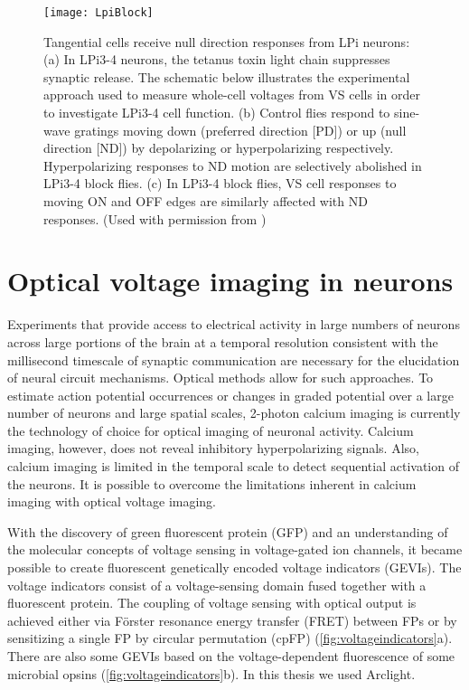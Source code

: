 \begin{figure}
\centering
\hspace*{-1cm} 
\texttt{[image: LpiBlock]}
\caption[Tangential cells receive null direction responses from LPi neurons] {Tangential cells receive null direction responses from LPi neurons: (a) In LPi3-4 neurons, the tetanus toxin light chain suppresses synaptic release. The schematic below illustrates the experimental approach used to measure whole-cell voltages from VS cells in order to investigate LPi3-4 cell function. (b) Control flies respond to sine-wave gratings moving down (preferred direction [PD]) or up (null direction [ND]) by depolarizing or hyperpolarizing respectively. Hyperpolarizing responses to ND motion are selectively abolished in LPi3-4 block flies. (c) In LPi3-4 block flies, VS cell responses to moving ON and OFF edges are similarly affected with ND responses. (Used with permission from \parencite{Mauss2015})} 
\label{fig:lpiblock}
\end{figure}

\section{Optical voltage imaging in neurons}
Experiments that provide access to electrical activity in large numbers of neurons across large portions of the brain at a temporal resolution consistent with the millisecond timescale of synaptic communication are necessary for the elucidation of neural circuit mechanisms. Optical methods allow for such approaches. To estimate action potential occurrences or changes in graded potential over a large number of neurons and large spatial scales, 2-photon calcium imaging is currently the technology of choice for optical imaging of neuronal activity. Calcium imaging, however, does not reveal inhibitory hyperpolarizing signals. Also, calcium imaging is limited in the temporal scale to detect sequential activation of the neurons. It is possible to overcome the limitations inherent in calcium imaging with optical voltage imaging.

With the discovery of green fluorescent protein (GFP) and an understanding of the molecular concepts of voltage sensing in voltage-gated ion channels, it became possible to create fluorescent genetically encoded voltage indicators (GEVIs). The voltage indicators consist of a voltage-sensing domain fused together with a fluorescent protein. The coupling of voltage sensing with optical output is achieved either via Förster resonance energy transfer (FRET) between FPs or by sensitizing a single FP by circular permutation (cpFP) (\ref{fig:voltageindicators}a). There are also some GEVIs based on the voltage-dependent fluorescence of some microbial opsins (\ref{fig:voltageindicators}b). In this thesis we used Arclight. 

